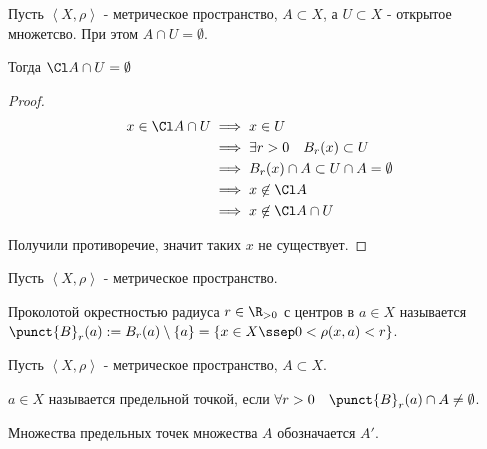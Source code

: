 \begin{consequence} \thmslashn

    Пусть $\left<X, \rho\right>$ - метрическое пространство, $A \subset X$, а $U \subset X$ - открытое множетсво. При этом $A\cap U = \emptyset$.

    Тогда $\Cl A\cap U = \emptyset$
    \begin{proof} \thmslashn
    
        \begin{equation*}
            \begin{split}
                x\in \Cl A\cap U 
                &\implies x\in U\\
                &\implies \exists{r > 0}\quad B_{r}(x) \subset U\\
                &\implies B_{r}(x)\cap A \subset U\cap A = \emptyset\\
                &\implies x \not\in \Cl A\\
                &\implies x \not\in \Cl A\cap U
            \end{split}
        \end{equation*}
        
        Получили противоречие, значит таких $x$ не существует.
    \end{proof}
\end{consequence}
\begin{definition} \thmslashn 

    Пусть $\left<X, \rho\right>$ - метрическое пространство.

    Проколотой окрестностью радиуса $r\in \R_{>0}$ с центров в $a\in X$ называется $\punct{B}_{r}(a) := B_{r}(a) \setminus \{a\} = \{x\in X \ssep 0 < \rho(x, a) < r\}$. 
\end{definition}
\begin{definition} \thmslashn 

    Пусть $\left<X, \rho\right>$ - метрическое пространство, $A \subset X$.

    $a\in X$ называется предельной точкой, если $\forall{r > 0}\quad \punct{B}_{r}(a)\cap A \neq \emptyset$.

    Множества предельных точек множества $A$ обозначается $A'$.
\end{definition}
